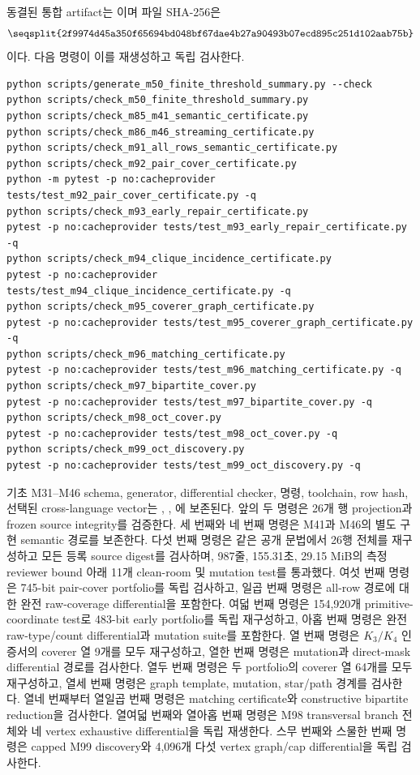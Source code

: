 \documentclass[11pt]{article}
\begin{document}
동결된 통합 artifact는
이며 파일 SHA-256은
\[
\texttt{\seqsplit{2f9974d45a350f65694bd048bf67dae4b27a90493b07ecd895c251d102aab75b}}
\]
이다. 다음 명령이 이를 재생성하고 독립 검사한다.
\begin{verbatim}
python scripts/generate_m50_finite_threshold_summary.py --check
python scripts/check_m50_finite_threshold_summary.py
python scripts/check_m85_m41_semantic_certificate.py
python scripts/check_m86_m46_streaming_certificate.py
python scripts/check_m91_all_rows_semantic_certificate.py
python scripts/check_m92_pair_cover_certificate.py
python -m pytest -p no:cacheprovider tests/test_m92_pair_cover_certificate.py -q
python scripts/check_m93_early_repair_certificate.py
pytest -p no:cacheprovider tests/test_m93_early_repair_certificate.py -q
python scripts/check_m94_clique_incidence_certificate.py
pytest -p no:cacheprovider tests/test_m94_clique_incidence_certificate.py -q
python scripts/check_m95_coverer_graph_certificate.py
pytest -p no:cacheprovider tests/test_m95_coverer_graph_certificate.py -q
python scripts/check_m96_matching_certificate.py
pytest -p no:cacheprovider tests/test_m96_matching_certificate.py -q
python scripts/check_m97_bipartite_cover.py
pytest -p no:cacheprovider tests/test_m97_bipartite_cover.py -q
python scripts/check_m98_oct_cover.py
pytest -p no:cacheprovider tests/test_m98_oct_cover.py -q
python scripts/check_m99_oct_discovery.py
pytest -p no:cacheprovider tests/test_m99_oct_discovery.py -q
\end{verbatim}
기초 M31--M46 schema, generator, differential checker, 명령, toolchain,
row hash, 선택된 cross-language vector는 , ,
에 보존된다.
앞의 두 명령은 26개 행 projection과 frozen source integrity를
검증한다. 세 번째와 네 번째 명령은 M41과 M46의 별도 구현 semantic
경로를 보존한다. 다섯 번째 명령은 같은 공개 문법에서 26행 전체를
재구성하고 모든 등록 source digest를 검사하며, 987줄, 155.31초,
29.15 MiB의 측정 reviewer bound 아래 11개 clean-room 및 mutation
test를 통과했다.
여섯 번째 명령은 745-bit pair-cover portfolio를 독립 검사하고,
일곱 번째 명령은 all-row 경로에 대한 완전 raw-coverage differential을
포함한다. 여덟 번째 명령은 154,920개 primitive-coordinate test로
483-bit early portfolio를 독립 재구성하고, 아홉 번째 명령은 완전
raw-type/count differential과 mutation suite를 포함한다. 열 번째
명령은 \(K_3/K_4\) 인증서의 coverer 열 9개를 모두 재구성하고, 열한
번째 명령은 mutation과 direct-mask differential 경로를 검사한다.
열두 번째 명령은 두 portfolio의 coverer 열 64개를 모두 재구성하고,
열세 번째 명령은 graph template, mutation, star/path 경계를 검사한다.
열네 번째부터 열일곱 번째 명령은 matching certificate와 constructive
bipartite reduction을 검사한다. 열여덟 번째와 열아홉 번째 명령은 M98
transversal branch 전체와 네 vertex exhaustive differential을 독립
재생한다. 스무 번째와 스물한 번째 명령은 capped M99 discovery와
4,096개 다섯 vertex graph/cap differential을 독립 검사한다.
\end{document}
